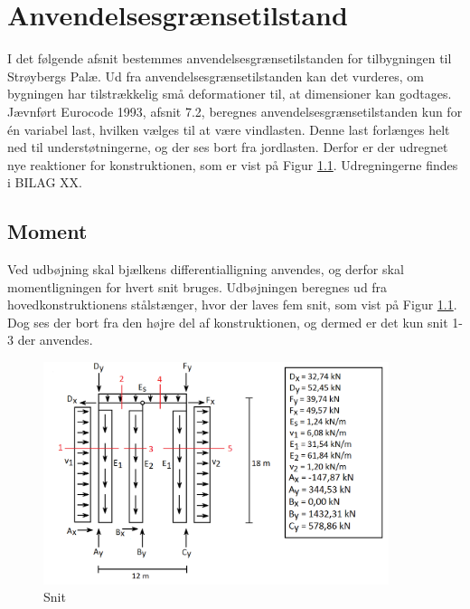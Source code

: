 \chapter{Anvendelsesgrænsetilstand}
I det følgende afsnit bestemmes anvendelsesgrænsetilstanden for tilbygningen til Strøybergs Palæ. Ud fra anvendelsesgrænsetilstanden kan det vurderes, om bygningen har tilstrækkelig små deformationer til, at dimensioner kan godtages. 
\newline \indent{     }  Jævnført Eurocode 1993, afsnit 7.2, beregnes anvendelsesgrænsetilstanden kun for én variabel last, hvilken vælges til at være vindlasten. Denne last forlænges helt ned til understøtningerne, og der ses bort fra jordlasten. Derfor er der udregnet nye reaktioner for konstruktionen, som er vist på Figur \ref{fig:snitanvendelse}. Udregningerne findes i BILAG XX. 

\section{Moment}
Ved udbøjning skal bjælkens differentialligning anvendes, og derfor skal momentligningen for hvert snit bruges. Udbøjningen beregnes ud fra hovedkonstruktionens stålstænger, hvor der laves fem snit, som vist på Figur \ref{fig:snitanvendelse}. Dog ses der bort fra den højre del af konstruktionen, og dermed er det kun snit 1-3 der anvendes.

\begin{figure}[H]
	\centering
	\includegraphics[width=0.9\textwidth]{billeder/snitanvendelse.png}
	\caption{Snit}
	\label{fig:snitanvendelse}
\end{figure}


